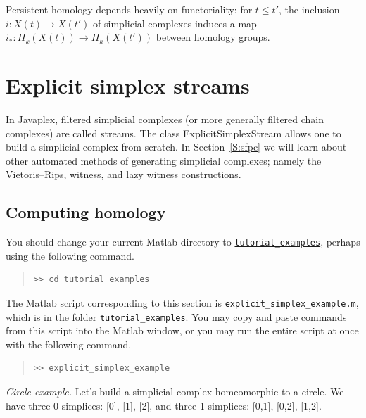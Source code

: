 \documentclass[amscd, amssymb, verbatim]{amsart}[12pt]
\theoremstyle{remark}
\theoremstyle{remark}
\theoremstyle{remark}
\begin{document}
Persistent homology depends heavily on functoriality: for $t\leq t'$, the inclusion $i:X(t)\to X(t')$ of simplicial complexes induces a map $i_*:H_k(X(t))\to H_k(X(t'))$ between homology groups. 




\section{Explicit simplex streams}\label{S:explicitStream}

In Javaplex, filtered simplicial complexes (or more generally filtered chain complexes) are called streams. The class ExplicitSimplexStream allows one to build a simplicial complex from scratch. In Section~\ref{S:sfpc} we will learn about other automated methods of generating simplicial complexes; namely the Vietoris--Rips, witness, and lazy witness constructions. 


\subsection{Computing homology}

You should change your current Matlab directory to \href{https://github.com/appliedtopology/javaplex/tree/master/src/matlab/for_distribution/tutorial_examples}{\texttt{tutorial\_examples}}, perhaps using the following command.

\begin{quote} \begin{verbatim} 
>> cd tutorial_examples
\end{verbatim} \end{quote}

The Matlab script corresponding to this section is \href{https://github.com/appliedtopology/javaplex/tree/master/src/matlab/for_distribution/tutorial_examples/explicit_simplex_example.m}{\texttt{explicit\_simplex\_example.m}}, which is in the folder \href{https://github.com/appliedtopology/javaplex/tree/master/src/matlab/for_distribution/tutorial_examples}{\texttt{tutorial\_examples}}. You may copy and paste commands from this script into the Matlab window, or you may run the entire script at once with the following command.

\begin{quote} \begin{verbatim} 
>> explicit_simplex_example
\end{verbatim} \end{quote}

{\em Circle example.} Let's build a simplicial complex homeomorphic to a circle. We have three 0-simplices: [0], [1], [2], and three 1-simplices: [0,1], [0,2], [1,2].
\end{document}

